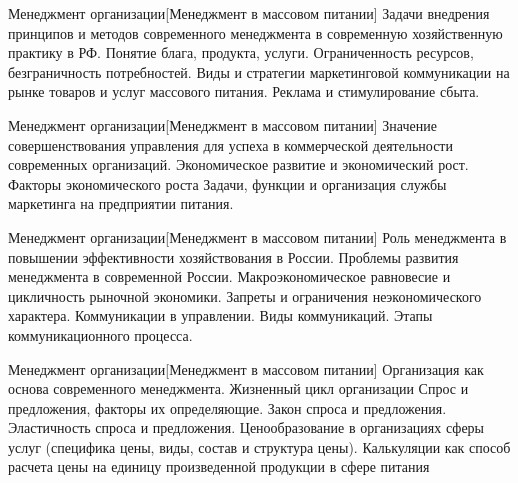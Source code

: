 \documentclass[
	11pt,
	a4paper,
	]
	{article}
\begin{document}
	

\begin{minipage}[t][\miniH]{\miniL}\centering
	 {Менеджмент организации}[Менеджмент в массовом питании]
		{
			Задачи внедрения принципов и методов современного менеджмента в современную хозяйственную практику в РФ.
		}{
			Понятие блага, продукта, услуги. Ограниченность ресурсов, безграничность потребностей.
		}{
			Виды и стратегии маркетинговой коммуникации на рынке товаров и услуг массового питания. Реклама и стимулирование сбыта.
		}
	\lowGE
\end{minipage}

\vfill



\begin{minipage}[t][\miniH]{\miniL}\centering
	 {Менеджмент организации}[Менеджмент в массовом питании]
		{
			Значение совершенствования управления для успеха в коммерческой деятельности современных организаций.
		}{
			Экономическое развитие и экономический рост. Факторы экономического роста
		}{
			Задачи, функции и организация службы маркетинга на предприятии питания.
		}
	\lowGE
\end{minipage}

\vfill



\begin{minipage}[t][\miniH]{\miniL}\centering
	 {Менеджмент организации}[Менеджмент в массовом питании]
		{
			Роль менеджмента в повышении эффективности хозяйствования в России. Проблемы развития менеджмента в современной России.
		}{
			Макроэкономическое равновесие и цикличность рыночной экономики. Запреты и ограничения неэкономического характера.
		}{
			Коммуникации в управлении. Виды коммуникаций. Этапы коммуникационного процесса.
		}
	\lowGE
\end{minipage}





\begin{minipage}[t][\miniH]{\miniL}\centering
	 {Менеджмент организации}[Менеджмент в массовом питании]
		{
			Организация как основа современного менеджмента. Жизненный цикл организации
		}{
			Спрос и предложения, факторы их определяющие. Закон спроса и предложения. Эластичность спроса и предложения.
		}{
			Ценообразование в организациях сферы услуг (специфика цены, виды, состав и структура цены). Калькуляции как способ расчета цены на единицу произведенной продукции в сфере питания
		}
	\lowGE
\end{minipage}
\end{document}
